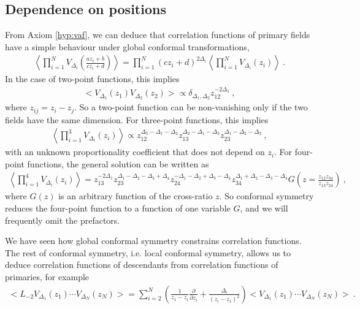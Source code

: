 \documentclass[12pt, a4paper]{article}
\theoremstyle{break}
\begin{document}
\subsection{Dependence on positions}

From Axiom \ref{hyp:vaf}, we can deduce that correlation functions of primary fields have a simple behaviour under global conformal transformations,
\begin{align}
 \left< \prod_{i=1}^N  V_{\Delta_i}\left(\frac{az_i+b}{cz_i+d}\right) \right>
 = \prod_{i=1}^N (cz_i +d)^{2\Delta_i} \left< \prod_{i=1}^N V_{\Delta_i}(z_i) \right>\ .
 \label{eq:zgc}
\end{align}
In the case of two-point functions, this implies
\begin{align}
 \Big< V_{\Delta_1}(z_1)V_{\Delta_2}(z_2) \Big> \propto \delta_{\Delta_1,\Delta_2} z_{12}^{-2\Delta_1} \ ,
 \label{eq:2pt}
\end{align}
where $z_{ij} = z_i - z_j$.
So a two-point function can be non-vanishing only if the two fields have the same dimension.
For three-point functions, this implies
\begin{align}
 \left< \prod_{i=1}^3 V_{\Delta_i}(z_i) \right> \propto z_{12}^{\Delta_3-\Delta_1-\Delta_2} z_{13}^{\Delta_2-\Delta_1-\Delta_3} z_{23}^{\Delta_1-\Delta_2-\Delta_3}\ ,
 \label{eq:3pt}
\end{align}
with an unknown proportionality coefficient that does not depend on $z_i$.
For four-point functions, the general solution can be written as 
\begin{align}
 \left< \prod_{i=1}^4 V_{\Delta_i}(z_i) \right> 
 = z_{13}^{-2\Delta_1} z_{23}^{\Delta_1-\Delta_2-\Delta_3+\Delta_4} z_{24}^{-\Delta_1-\Delta_2+\Delta_3-\Delta_4} z_{34}^{\Delta_1+\Delta_2-\Delta_3-\Delta_4} G\left(z=\frac{z_{12}z_{34}}{z_{13}z_{24}}\right)\ ,
 \label{eq:4pt}
\end{align}
where $G(z)$ is an arbitrary function of the cross-ratio $z$. 
So conformal symmetry reduces the four-point function to a function of one variable $G$, and we will frequently omit the prefactors.

We have seen how global conformal symmetry constrains correlation functions. The rest of conformal symmetry, i.e. local conformal symmetry, allows us to deduce correlation functions of descendants from correlation functions of primaries, for example
\begin{align}
 \Big< L_{-2}V_{\Delta_1}(z_1) \cdots V_{\Delta_N}(z_N) \Big>
  =\sum_{i=2}^N\left(\frac{1}{z_1-z_i}\frac{\partial}{\partial z_i} +\frac{\Delta_i}{(z_i-z_1)^2}\right)  \Big< V_{\Delta_1}(z_1) \cdots V_{\Delta_N}(z_N)\Big>\ .
  \label{eq:ltv}
\end{align}
\end{document}
